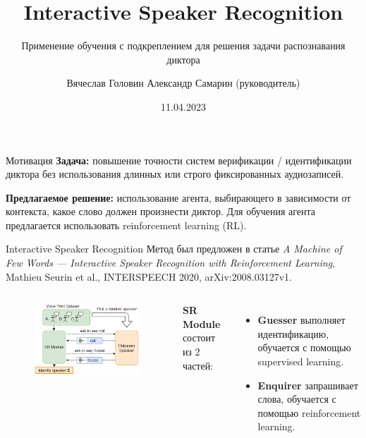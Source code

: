 \documentclass{beamer}
\title{Interactive Speaker Recognition}
\subtitle{Применение обучения с подкреплением для решения задачи распознавания
          диктора}
\author[В.С.~Головин]{Вячеслав Головин \texorpdfstring{\newline}{, }
    {\small Александр Самарин (руководитель)}}
\institute[ВШЭ]{Huawei CBG AI и ФКН ВШЭ СПб}
\date{11.04.2023}
\begin{document}
\frame{\titlepage}

\begin{frame}{Мотивация}
    \textbf{Задача:} повышение точности систем верификации / идентификации
    диктора без использования длинных или строго фиксированных
    аудиозаписей.\vspace{1em}

    \textbf{Предлагаемое решение:} использование агента, выбирающего в
    зависимости от контекста, какое слово должен произнести диктор. Для обучения
    агента предлагается использовать reinforcement learning (RL).
\end{frame}

\begin{frame}{Interactive Speaker Recognition}
    Метод был предложен в статье \textit{A Machine of Few Words --- Interactive
    Speaker Recognition with Reinforcement Learning}, Mathieu Seurin et al.,
    INTERSPEECH 2020, arXiv:2008.03127v1.\vspace{1em}

    \begin{columns}
    
    \begin{figure}[bht]
        \includegraphics[width=.9\textwidth]{isr_game_large.png}
    \end{figure}

    \textbf{SR Module} состоит из 2 частей:
    \begin{itemize}
        \item \textbf{Guesser} выполняет идентификацию, обучается с помощью
              supervised learning.
        \item \textbf{Enquirer} запрашивает слова, обучается с помощью
              reinforcement learning.
    \end{itemize}
    
    \end{columns}
\end{frame}
\end{document}
